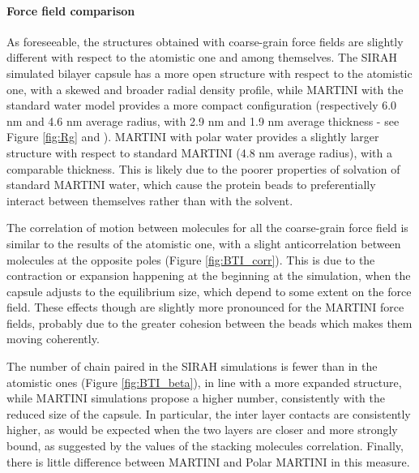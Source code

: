 \paragraph{Force field comparison}
As foreseeable, the structures obtained with coarse-grain force fields are slightly different with respect to the atomistic one and among themselves.
%
The SIRAH simulated bilayer capsule has a more open structure with respect to the atomistic one, with a skewed and broader radial density profile, while MARTINI with the standard water model provides a more compact configuration (respectively 6.0 nm and 4.6 nm average radius, with 2.9 nm and 1.9 nm average thickness - see Figure \ref{fig:Rg} and ). MARTINI with polar water provides a slightly larger structure with respect to standard MARTINI (4.8 nm average radius), with a comparable thickness. This is likely due to the poorer properties of solvation of standard MARTINI water, which cause the protein beads to preferentially interact between themselves rather than with the solvent. 

The correlation of motion between molecules for all the coarse-grain force field is similar to the results of the atomistic one, with a slight anticorrelation between molecules at the opposite poles (Figure \ref{fig:BTI_corr}). This is due to the contraction or expansion happening at the beginning at the simulation, when the capsule adjusts to the equilibrium size, which depend to some extent on the force field.
%
These effects though are slightly more pronounced for the MARTINI force fields, probably due to the greater cohesion between the beads which makes them moving coherently.

The number of chain paired in the SIRAH simulations is fewer than in the atomistic ones (Figure \ref{fig:BTI_beta}), in line with a more expanded structure, while MARTINI simulations propose a higher number, consistently with the reduced size of the capsule. In particular, the inter layer contacts are consistently higher, as would be expected when the two layers are closer and more strongly bound, as suggested by the values of the stacking molecules correlation. Finally, there is little difference between MARTINI and Polar MARTINI in this measure.

